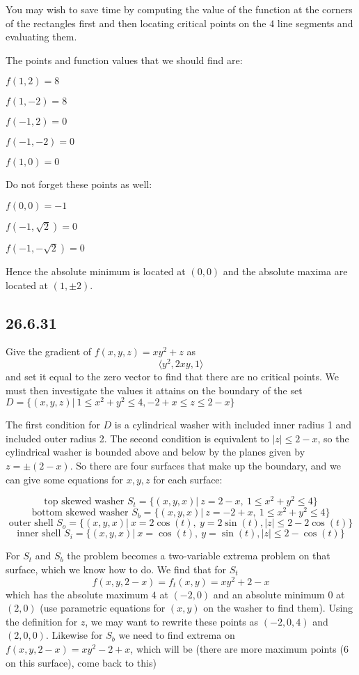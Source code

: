 \documentclass{article}
\begin{document}
You may wish to save time by computing the value of the function at the corners of the rectangles first and then locating critical points on the 4 line segments and evaluating them.

The points and function values that we should find are:

$f(1,2) = 8$

$f(1,-2) = 8$

$f(-1,2) = 0$

$f(-1,-2) = 0$

$f(1,0) = 0$

Do not forget these points as well:

$f(0,0) = -1$

$f(-1,\sqrt{2}) = 0$

$f(-1,-\sqrt{2}) = 0$

Hence the absolute minimum is located at $(0,0)$ and the absolute maxima are located at $(1,\pm 2)$.

\subsection{26.6.31}

Give the gradient of $f(x,y,z) = xy^2+z$ as $$\langle y^2, 2xy ,1 \rangle$$ and set it equal to the zero vector to find that there are no critical points. We must then investigate the values it attains on the boundary of the set $D = \{(x,y,z)|~1\leq x^2+y^2\leq 4, -2+x\leq z \leq 2-x\}$ 

The first condition for $D$ is a cylindrical washer with included inner radius 1 and included outer radius 2. The second condition is equivalent to $|z| \leq 2-x$, so the cylindrical washer is bounded above and below by the planes given by $z = \pm (2-x)$. So there are four surfaces that make up the boundary, and we can give some equations for $x,y,z$ for each surface:

$$\text{top skewed washer } S_t = \{(x,y,x) |~z=2-x,~ 1\leq x^2+y^2\leq 4\}$$
$$\text{bottom skewed washer } S_b = \{(x,y,x) |~z=-2+x,~ 1\leq x^2+y^2\leq 4\}$$
$$\text{outer shell } S_o = \{(x,y,x) |~ x=2\cos(t),~ y=2\sin(t), |z| \leq 2-2\cos(t)\}$$
$$\text{inner shell } S_i = \{(x,y,x) |~ x=\cos(t),~ y=\sin(t), |z| \leq 2-\cos(t) \}$$

For $S_t$ and $S_b$ the problem becomes a two-variable extrema problem on that surface, which we know how to do. We find that for $S_t$ $$f(x,y,2-x) = f_t(x,y) = xy^2+2-x$$ which has the absolute maximum $4$ at $(-2,0)$ and an absolute minimum $0$ at $(2,0)$ (use parametric equations for $(x,y)$ on the washer to find them). Using the definition for $z$, we may want to rewrite these points as $(-2,0,4)$ and $(2,0,0)$. Likewise for $S_b$ we need to find extrema on $f(x,y,2-x) = xy^2-2+x$, which will be (there are more maximum points (6 on this surface), come back to this)
\end{document}

